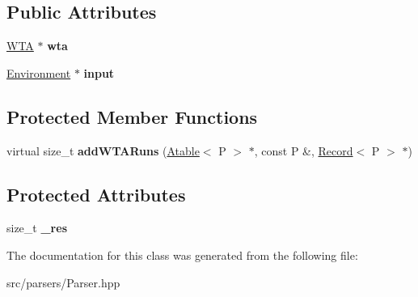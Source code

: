 \subsection*{Public Attributes}
\begin{DoxyCompactItemize}
\item 
\mbox{\label{classParser_a1d6da7c9962be0987caf9bf69f634ea6}} 
\mbox{\hyperlink{classWTA}{W\+TA}} $\ast$ {\bfseries wta}
\item 
\mbox{\label{classParser_a5ab3cb7f02f7bb33dd59f3edbf63675a}} 
\mbox{\hyperlink{classEnvironment}{Environment}} $\ast$ {\bfseries input}
\end{DoxyCompactItemize}
\subsection*{Protected Member Functions}
\begin{DoxyCompactItemize}
\item 
\mbox{\label{classParser_a00a7b213fe0e4f8cce4e780adbbbd110}} 
virtual size\+\_\+t {\bfseries add\+W\+T\+A\+Runs} (\mbox{\hyperlink{classAtable}{Atable}}$<$ P $>$ $\ast$, const P \&, \mbox{\hyperlink{classRecord}{Record}}$<$ P $>$ $\ast$)
\end{DoxyCompactItemize}
\subsection*{Protected Attributes}
\begin{DoxyCompactItemize}
\item 
\mbox{\label{classParser_a82a307f632a1988fe229f989bbc4584d}} 
size\+\_\+t {\bfseries \+\_\+res}
\end{DoxyCompactItemize}


The documentation for this class was generated from the following file\+:\begin{DoxyCompactItemize}
\item 
src/parsers/Parser.\+hpp\end{DoxyCompactItemize}
